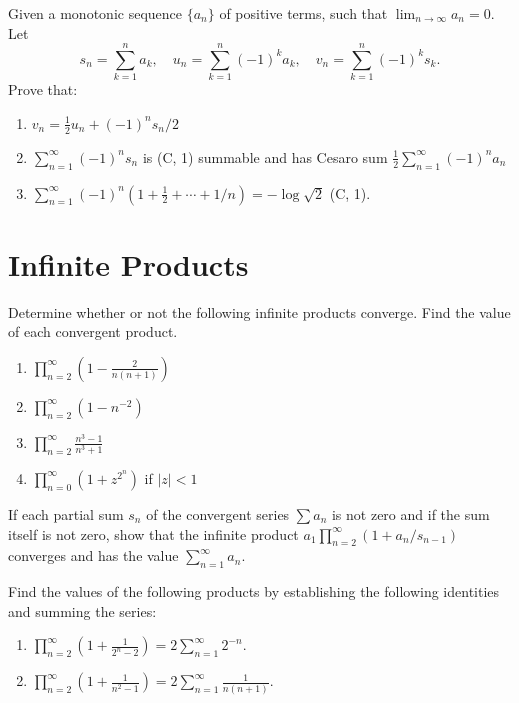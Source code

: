 \begin{problembox}
Given a monotonic sequence \(\{a_n\}\) of positive terms, such that \(\lim_{n \to \infty} a_n = 0\). Let
\[s_n = \sum_{k=1}^{n} a_k, \quad u_n = \sum_{k=1}^{n} (-1)^k a_k, \quad v_n = \sum_{k=1}^{n} (-1)^k s_k.\]
Prove that:
\begin{enumerate}[label=\alph*)]
\item \(v_n = \frac{1}{2} u_n + (-1)^n s_n / 2\)
\item \(\sum_{n=1}^{\infty} (-1)^n s_n\) is (C, 1) summable and has Cesaro sum \(\frac{1}{2} \sum_{n=1}^{\infty} (-1)^n a_n\)
\item \(\sum_{n=1}^{\infty} (-1)^n (1 + \frac{1}{2} + \cdots + 1/n) = -\log \sqrt{2}\) (C, 1).
\end{enumerate}
\end{problembox}

\section{Infinite Products}



\begin{problembox}
Determine whether or not the following infinite products converge. Find the value of each convergent product.
\begin{enumerate}[label=\alph*)]
\item \(\prod_{n=2}^{\infty} \left( 1 - \frac{2}{n(n+1)} \right)\)
\item \(\prod_{n=2}^{\infty} (1 - n^{-2})\)
\item \(\prod_{n=2}^{\infty} \frac{n^3 - 1}{n^3 + 1}\)
\item \(\prod_{n=0}^{\infty} (1 + z^{2^n})\) if \(|z| < 1\)
\end{enumerate}
\end{problembox}



\begin{problembox}
If each partial sum \(s_n\) of the convergent series \(\sum a_n\) is not zero and if the sum itself is not zero, show that the infinite product \(a_1 \prod_{n=2}^{\infty} (1 + a_n / s_{n-1})\) converges and has the value \(\sum_{n=1}^{\infty} a_n\).
\end{problembox}



\begin{problembox}
Find the values of the following products by establishing the following identities and summing the series:
\begin{enumerate}[label=\alph*)]
\item \(\prod_{n=2}^{\infty} \left( 1 + \frac{1}{2^n - 2} \right) = 2 \sum_{n=1}^{\infty} 2^{-n}\).
\item \(\prod_{n=2}^{\infty} \left( 1 + \frac{1}{n^2 - 1} \right) = 2 \sum_{n=1}^{\infty} \frac{1}{n(n+1)}\).
\end{enumerate}
\end{problembox}



